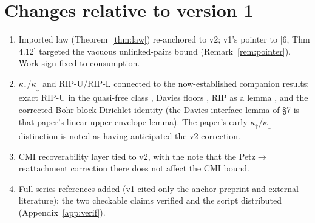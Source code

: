 \documentclass[11pt,a4paper]{article}
\theoremstyle{plain}
\theoremstyle{definition}
\theoremstyle{remark}
\newcommand{\kup}{\kappa_{\uparrow}}
\newcommand{\kdn}{\kappa_{\downarrow}}
\begin{document}
\section{Changes relative to version 1}

\begin{enumerate}
\item Imported law (Theorem~\ref{thm:law}) re-anchored to \cite{Work} v2; v1's
pointer to [6, Thm 4.12] targeted the vacuous unlinked-pairs bound
(Remark~\ref{rem:pointer}). Work sign fixed to consumption.
\item $\kup/\kdn$ and RIP-U/RIP-L connected to the now-established companion
results: exact RIP-U in the quasi-free class \cite{HCut}, Davies floors
\cite{Stress}, RIP as a lemma \cite{RIP}, and the corrected Bohr-block
Dirichlet identity \cite{DaviesCore} (the Davies interface lemma of \S7 is
that paper's linear upper-envelope lemma). The paper's early $\kup/\kdn$
distinction is noted as having anticipated the \cite{Stress} v2 correction.
\item CMI recoverability layer tied to \cite{Clustering} v2, with the note
that the Petz$\to$reattachment correction there does not affect the CMI
bound.
\item Full series references added (v1 cited only the anchor preprint and
external literature); the two checkable claims verified and the script
distributed (Appendix~\ref{app:verif}).
\end{enumerate}
\end{document}
